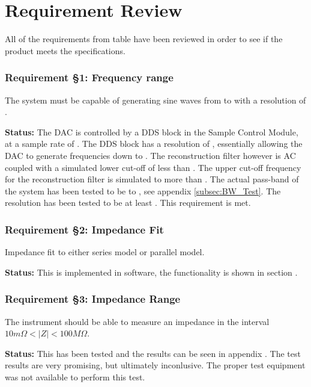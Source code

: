 \section{Requirement Review} \label{subsec:8_1_ReqReview}

All of the requirements from table  have been reviewed in order to see if the product meets the specifications.


\subsubsection*{Requirement §1: Frequency range}
The system must be capable of generating sine waves from  to  with a resolution of .

\textbf{Status:} The DAC is controlled by a DDS block in the Sample Control Module, at a sample rate of . The DDS block has a resolution of , essentially allowing the DAC to generate frequencies down to . The reconstruction filter however is AC coupled with a simulated lower cut-off of less than . The upper cut-off frequency for the reconstruction filter is simulated to more than . The actual pass-band of the system has been tested to be  to , see appendix \ref{subsec:BW_Test}. The resolution has been tested to be at least . This requirement is met.
\nl
\nl

\subsubsection*{Requirement §2: Impedance Fit}
Impedance fit to either series model or parallel model.

\textbf{Status:} This is implemented in software, the functionality is shown in section .
\nl
\nl

\subsubsection*{Requirement §3: Impedance Range}
The instrument should be able to measure an impedance in the interval $10m\Omega < |Z| < 100M \Omega$. 

\textbf{Status:} This has been tested and the results can be seen in appendix . The test results are very promising, but ultimately inconlusive. The proper test equipment was not available to perform this test.
\nl
\nl

